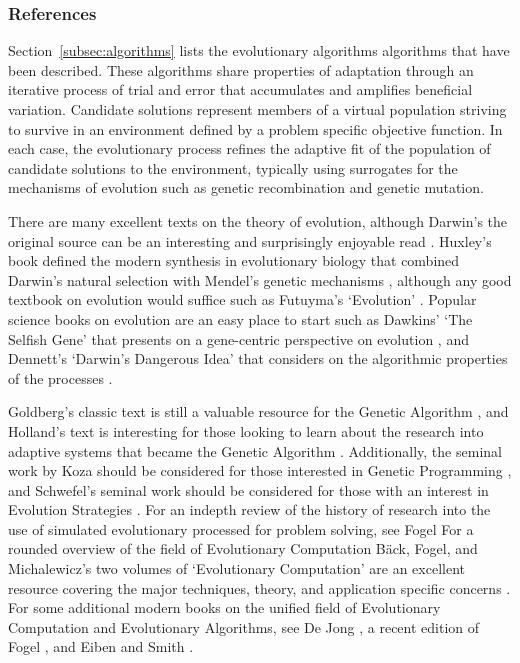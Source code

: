 \documentclass[a4paper, 11pt]{article}
\begin{document}
\subsubsection{References}
Section~\ref{subsec:algorithms} lists the evolutionary algorithms algorithms that have been described. These algorithms share properties of adaptation through an iterative process of trial and error that accumulates and amplifies beneficial variation. Candidate solutions represent members of a virtual population striving to survive in an environment defined by a problem specific objective function. In each case, the evolutionary process refines the adaptive fit of the population of candidate solutions to the environment, typically using surrogates for the mechanisms of evolution such as genetic recombination and genetic mutation.

There are many excellent texts on the theory of evolution, although Darwin's the original source can be an interesting and surprisingly enjoyable read \cite{Darwin1859}. Huxley's book defined the modern synthesis in evolutionary biology that combined Darwin's natural selection with Mendel's genetic mechanisms \cite{Huxley1942}, although any good textbook on evolution would suffice such as Futuyma's `Evolution' \cite{Futuyma2009}. Popular science books on evolution are an easy place to start such as Dawkins' `The Selfish Gene' that presents on a gene-centric perspective on evolution \cite{Dawkins1976}, and Dennett's `Darwin's Dangerous Idea' that considers on the algorithmic properties of the processes \cite{Dennett1995}.

Goldberg's classic text is still a valuable resource for the Genetic Algorithm \cite{Goldberg1989}, and Holland's text is interesting for those looking to learn about the research into adaptive systems that became the Genetic Algorithm \cite{Holland1975}. Additionally, the seminal work by Koza should be considered for those interested in Genetic Programming \cite{Koza1992}, and Schwefel's seminal work should be considered for those with an interest in Evolution Strategies \cite{Schwefel1981}. For an indepth review of the history of research into the use of simulated evolutionary processed for problem solving, see Fogel \cite{Fogel1998}
For a rounded overview of the field of Evolutionary Computation B\"ack, Fogel, and Michalewicz's two volumes of `Evolutionary Computation' are an excellent resource covering the major techniques, theory, and application specific concerns \cite{Baeck2000, Baeck2000a}.
For some additional modern books on the unified field of Evolutionary Computation and Evolutionary Algorithms, see De Jong \cite{Jong2006}, a recent edition of Fogel \cite{Fogel1995}, and Eiben and Smith \cite{Eiben2003}. 
\end{document}
